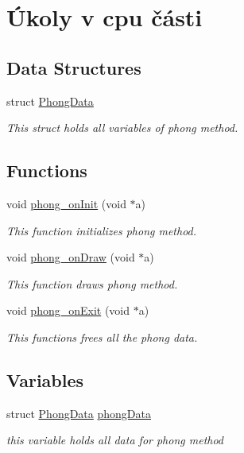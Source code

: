 \hypertarget{group__cpu__side}{}\section{Úkoly v cpu části}
\label{group__cpu__side}
\subsection*{Data Structures}
\begin{DoxyCompactItemize}
\item 
struct \hyperlink{structPhongData}{Phong\+Data}
\begin{DoxyCompactList}\small\item\em This struct holds all variables of phong method. \end{DoxyCompactList}\end{DoxyCompactItemize}
\subsection*{Functions}
\begin{DoxyCompactItemize}
\item 
void \hyperlink{group__cpu__side_gab4efb950833c87be9cd3b3850be50e77}{phong\+\_\+on\+Init} (void $\ast$a)
\begin{DoxyCompactList}\small\item\em This function initializes phong method. \end{DoxyCompactList}\item 
void \hyperlink{group__cpu__side_ga077fd875cff025bec23bb738ac61278a}{phong\+\_\+on\+Draw} (void $\ast$a)
\begin{DoxyCompactList}\small\item\em This function draws phong method. \end{DoxyCompactList}\item 
void \hyperlink{group__cpu__side_gada78d4a6f5eb4c7cff394ae84b414e10}{phong\+\_\+on\+Exit} (void $\ast$a)
\begin{DoxyCompactList}\small\item\em This functions frees all the phong data. \end{DoxyCompactList}\end{DoxyCompactItemize}
\subsection*{Variables}
\begin{DoxyCompactItemize}
\item 
\mbox{\label{group__cpu__side_gaf80898fd19b8fe287ae668bf03e6de72}} 
struct \hyperlink{structPhongData}{Phong\+Data} \hyperlink{group__cpu__side_gaf80898fd19b8fe287ae668bf03e6de72}{phong\+Data}
\begin{DoxyCompactList}\small\item\em this variable holds all data for phong method \end{DoxyCompactList}\end{DoxyCompactItemize}


